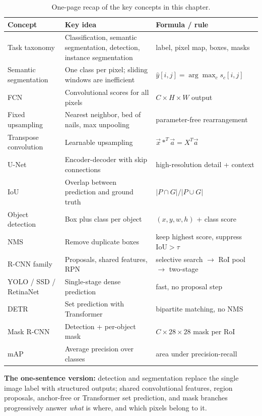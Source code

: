 \begin{table}[htbp]
\centering
\small
\renewcommand{\arraystretch}{1.05}
\begin{tabular}{p{} p{} p{}}
\toprule
\textbf{Concept} & \textbf{Key idea} & \textbf{Formula / rule} \\
\midrule
Task taxonomy & Classification, semantic segmentation, detection, instance segmentation & label, pixel map, boxes, masks \\
Semantic segmentation & One class per pixel; sliding windows are inefficient & $\hat{y}[i,j]=\arg\max_c s_c[i,j]$ \\
FCN & Convolutional scores for all pixels & $C \times H \times W$ output \\
Fixed upsampling & Nearest neighbor, bed of nails, max unpooling & parameter-free rearrangement \\
Transpose convolution & Learnable upsampling & $\vec{x}*^T\vec{a}=X^T\vec{a}$ \\
U-Net & Encoder-decoder with skip connections & high-resolution detail + context \\
IoU & Overlap between prediction and ground truth & $|P\cap G|/|P\cup G|$ \\
Object detection & Box plus class per object & $(x,y,w,h)$ + class score \\
NMS & Remove duplicate boxes & keep highest score, suppress $\mathrm{IoU}>\tau$ \\
R-CNN family & Proposals, shared features, RPN & selective search $\to$ RoI pool $\to$ two-stage \\
YOLO / SSD / RetinaNet & Single-stage dense prediction & fast, no proposal step \\
DETR & Set prediction with Transformer & bipartite matching, no NMS \\
Mask R-CNN & Detection + per-object mask & $C\times28\times28$ mask per RoI \\
mAP & Average precision over classes & area under precision-recall \\
\bottomrule
\end{tabular}
\caption{One-page recap of the key concepts in this chapter.}\label{tab:ch6_recap}
\end{table}

\begin{InsightBox}
\textbf{The one-sentence version:} detection and segmentation replace the single image label with structured outputs; shared convolutional features, region proposals, anchor-free or Transformer set prediction, and mask branches progressively answer \emph{what} is where, and which pixels belong to it.
\end{InsightBox}
